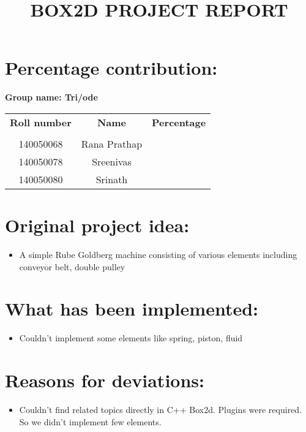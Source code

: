\documentclass[10pt,a4paper]{article}
\title{BOX2D PROJECT REPORT}
\begin{document}
\maketitle
\section*{\textbf{Percentage contribution:}}
\textbf{Group name: Tri/ode}

  \begin{center}
    \begin{tabular}{ccl}
    
      \textbf{Roll number}& \textbf{Name}& \textbf{Percentage}\\\\
      
              140050068&Rana Prathap\\
              140050078&Sreenivas\\
              140050080&Srinath\\
     
    \end{tabular}
  \end{center}

\section*{\textbf{Original project idea:}}

\begin{itemize}[itemsep = -0.75 mm, leftmargin=*]
\item  A simple Rube Goldberg machine consisting of various elements including conveyor belt, double pulley
\end{itemize}
\vspace{-10pt}

\section*{\textbf{What has been implemented:}}
\begin{itemize}[itemsep = -0.75 mm, leftmargin=*]
\item Couldn't implement some elements like spring, piston, fluid
\end{itemize}

\vspace{-10pt}
\section*{\textbf{Reasons for deviations:}}
\begin{itemize}[itemsep = -0.75 mm, leftmargin=*]
\item Couldn't find related topics directly in C++ Box2d. Plugins were required. So we didn't implement few elements.
\end{itemize}
\vspace{-10pt}
\end{document}
